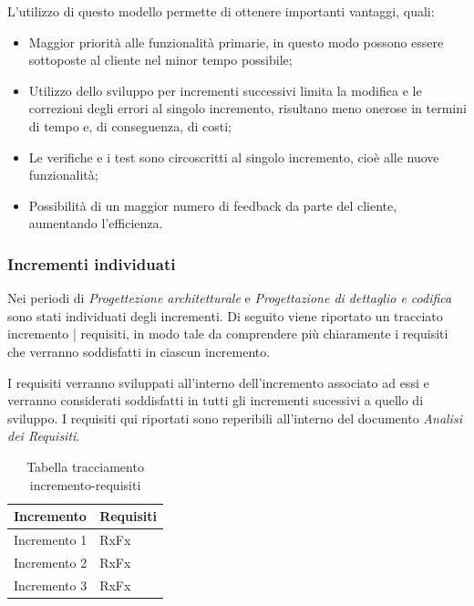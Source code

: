 \documentclass[../piano_di_progetto.tex]{subfiles}
\begin{document}
L'utilizzo di questo modello permette di ottenere importanti vantaggi, quali:
\begin{itemize}
    \item Maggior priorità alle funzionalità primarie, in questo modo possono essere sottoposte al cliente nel minor tempo possibile;
    \item Utilizzo dello sviluppo per incrementi successivi limita la modifica e le correzioni degli errori al singolo incremento, risultano meno onerose in termini di tempo e, di conseguenza, di costi;
    \item Le verifiche e i test sono circoscritti al singolo incremento, cioè alle nuove funzionalità;
    \item Possibilità di un maggior numero di feedback da parte del cliente, aumentando l'efficienza.
\end{itemize}

\subsubsection{Incrementi individuati}
\label{ssub:incr_ind}

Nei periodi di \emph{Progettezione architetturale} e \emph{Progettazione di dettaglio e codifica} sono stati individuati degli incrementi.
Di seguito viene riportato un tracciato incremento | requisiti, in modo tale da comprendere più chiaramente i requisiti che verranno soddisfatti in ciascun incremento. 

I requisiti verranno sviluppati all'interno dell'incremento associato ad essi e verranno considerati soddisfatti in tutti gli incrementi sucessivi a quello di sviluppo. I requisiti qui riportati sono reperibili all'interno del documento \emph{Analisi dei Requisiti}.
\begin{table}[!ht]
	\centering
	\begin{tabular}{|p{3cm}|p{3cm}|}
	\hline
	\rowcolor{lightgray}
	\textbf{Incremento} & \textbf{Requisiti}\\
	\hline
        Incremento 1 & RxFx\\
        Incremento 2 & RxFx\\
        Incremento 3 & RxFx\\
	\hline	
	\end{tabular}
	\caption{Tabella tracciamento incremento-requisiti}
\end{table}
\end{document}
